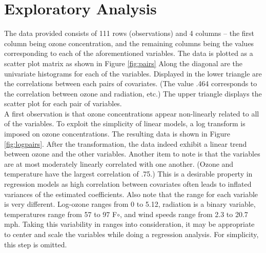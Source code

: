 \documentclass{../../tex_template/asaproc}
\begin{document}
\section{Exploratory Analysis}
The data provided consists of 111 rows (observations) and 4 columns -- the
first column being ozone concentration, and the remaining columns being the
values corresponding to each of the aforementioned variables. The data is
plotted as a scatter plot matrix as shown in Figure \ref{fig:pairs} Along the
diagonal are the univariate histograms for each of the variables. Displayed in the
lower triangle are the correlations between each pairs of covariates. (The 
value .464 corresponds to the correlation between ozone and radiation, etc.)
The upper triangle displays the scatter plot for each pair of variables.\\


A first observation is that ozone concentrations appear non-linearly related to
all of the variables. To exploit the simplicity of linear models, a log
transform is imposed on ozone concentrations. The resulting data is shown in
Figure \ref{fig:logpairs}. After the transformation, the data indeed exhibit a
linear trend between ozone and the other variables. Another item to note is
that the variables are at most moderately linearly correlated with one another.
(Ozone and temperature have the largest correlation of .75.) This is a
desirable property in regression models as high correlation between covariates
often leads to inflated variances of the estimated coefficients. Also note that
the range for each variable is very different. Log-ozone ranges from 0 to 5.12,
radiation is a binary variable, temperatures range from 57 to 97 F$\circ$, and
wind speeds range from 2.3 to 20.7 mph. Taking this variability in ranges into
consideration, it may be appropriate to center and scale the variables while
doing a regression analysis. For simplicity, this step is omitted.

\end{document}
